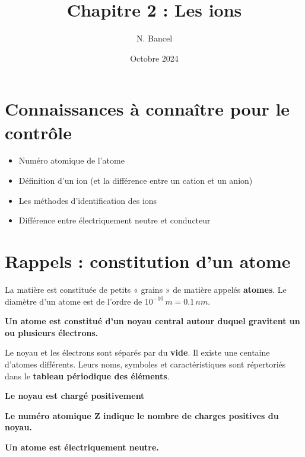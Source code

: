 \documentclass[a4paper,12pt]{article}
\begin{document}
\title{Chapitre 2 : Les ions}
\author{N. Bancel}
\date{Octobre 2024}
\maketitle

\section{Connaissances à connaître pour le contrôle}

\begin{tcolorbox}[colback=blue!10, colframe=blue!80, title=]
  \begin{itemize}
    \item Numéro atomique de l'atome
    \item Définition d'un ion (et la différence entre un cation et un anion)
    \item Les méthodes d'identification des ions
    \item Différence entre électriquement neutre et conducteur
  \end{itemize}
\end{tcolorbox}

\section{Rappels : constitution d'un atome}



La matière est constituée de petits « grains » de matière appelés \textbf{atomes}. Le diamètre d’un atome est de l’ordre de $10^{-10} \, m = 0.1 \, nm$.

\begin{tcolorbox}[colback=blue!10, colframe=blue!80, title=]
\textbf{Un atome est constitué d’un noyau central autour duquel gravitent un ou plusieurs électrons.}
\end{tcolorbox}

Le noyau et les électrons sont séparés par du \textbf{vide}. Il existe une centaine d’atomes différents. Leurs noms, symboles et caractéristiques sont répertoriés dans le \textbf{tableau périodique des éléments}.

\begin{tcolorbox}[colback=purple!10, colframe=purple!80, title=]
\textbf{Le noyau est chargé positivement} \par 
\textbf{Le numéro atomique Z indique le nombre de charges positives du noyau.} \par
\textbf{Un atome est électriquement neutre.}
\end{tcolorbox}
\end{document}

